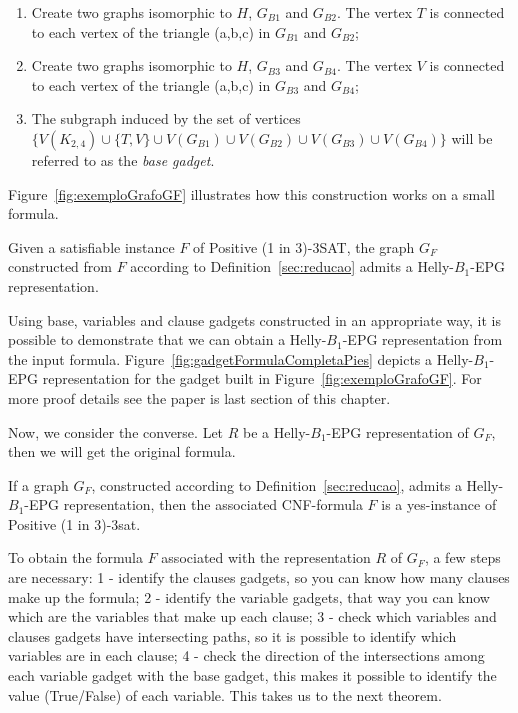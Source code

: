 \begin{definition}
\begin{enumerate}
\item Create two  graphs isomorphic to $H$, $G_{B1}$ and $G_{B2}$. The vertex $T$ is connected to each vertex of the triangle (a,b,c) in $G_{B1}$ and $G_{B2}$;


\item Create two graphs isomorphic  to $H$, $G_{B3}$ and $G_{B4}$. The vertex $V$ is connected to each vertex of the triangle (a,b,c) in $G_{B3}$ and $G_{B4}$;

\item The  subgraph induced by the set of vertices $\{V(K_{2,4}) \cup  \{T, V\} \cup V(G_{B1}) \cup V(G_{B2}) \cup V(G_{B3}) \cup V(G_{B4})\}$ will be referred to as the  \emph{base gadget}. 
\end{enumerate}
\end{definition}


Figure~\ref{fig:exemploGrafoGF} illustrates how this construction works on a small formula. 




\begin{lemma}\label{lem:ida}
Given a satisfiable instance $F$ of {\sc Positive (1 in 3)-3SAT}, the graph $G_F$ constructed from $F$ according to Definition~\ref{sec:reducao} admits a Helly-$B_1$-EPG representation.
\end{lemma}


Using base, variables and clause gadgets constructed in an appropriate way, it is possible to demonstrate that we can obtain a Helly-$B_1$-EPG representation from the input formula. Figure~\ref{fig:gadgetFormulaCompletaPies} depicts a Helly-$B_1$-EPG representation for the gadget built in Figure~\ref{fig:exemploGrafoGF}. For more proof details see the paper is last section of this chapter.




Now, we consider the converse. Let $R$ be a Helly-$B_1$-EPG representation of $G_F$, then we will get the original formula.


\begin{lemma}\label{lem:volta}
If a graph $G_F$, constructed according to Definition~\ref{sec:reducao}, admits a Helly-$B_1$-EPG representation, then the associated CNF-formula $F$ is a yes-instance of {\sc Positive (1 in 3)-3sat}.
\end{lemma}

To obtain the formula $F$ associated with the  representation $R$ of $G_F$, a few steps are necessary: 1 - identify the  clauses gadgets, so you can know how many clauses make up the formula; 2 - identify the variable gadgets, that way you can know which are the variables that make up each clause; 3 - check which variables and clauses gadgets have intersecting paths, so it is possible to identify which variables are in each clause; 4 - check the direction of the intersections among each variable gadget with the base gadget, this makes it possible to identify the value (True/False) of each variable.  This takes us to the next theorem.

